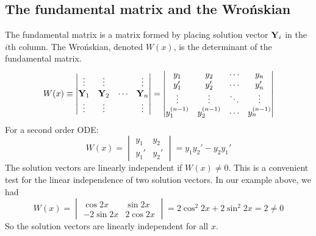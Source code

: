 \subsection{The fundamental matrix and the Wro\'nskian}
The fundamental matrix is a matrix formed by placing solution vector \(\vb Y_i\) in the \(i\)th column.
The Wro\'nskian, denoted \(W(x)\), is the determinant of the fundamental matrix.
\[
	W(x) \equiv \begin{vmatrix}
		\vdots  & \vdots  &        & \vdots  \\
		\vb Y_1 & \vb Y_2 & \cdots & \vb Y_n \\
		\vdots  & \vdots  &        & \vdots
	\end{vmatrix} = \begin{vmatrix}
		y_1         & y_2         & \cdots & y_n         \\
		y_1'        & y_2'        & \cdots & y_n'        \\
		\vdots      & \vdots      & \ddots & \vdots      \\
		y_1^{(n-1)} & y_2^{(n-1)} & \cdots & y_n^{(n-1)}
	\end{vmatrix}
\]
For a second order ODE:\@
\begin{equation}\label{wronskian2}
	W(x) = \begin{vmatrix}
		y_1 & y_2 \\ y_1' & y_2'
	\end{vmatrix}
	= y_1y_2' - y_2y_1'
\end{equation}
The solution vectors are linearly independent if \(W(x) \neq 0\).
This is a convenient test for the linear independence of two solution vectors.
In our example above, we had
\[
	W(x) = \begin{vmatrix}
		\cos 2x   & \sin 2x  \\
		-2\sin 2x & 2\cos 2x
	\end{vmatrix}
	= 2\cos^2 2x + 2\sin^2 2x = 2 \neq 0
\]
So the solution vectors are linearly independent for all \(x\).


